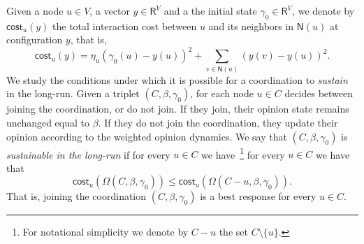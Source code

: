 \documentclass[letterpaper,11pt]{article}
\newcommand{\RR}{\mathsf{R}}
\newcommand{\nsf}{\mathsf{N}}
\newcommand{\cost}{\mathsf{cost}}
\begin{document}
Given a node $u\in V$, a vector $y\in \RR^V$ and a the initial state $\gamma_0\in \RR^V$, we denote by $\cost_u(y)$ the total interaction cost between $u$ and its neighbors in $\nsf(u)$ at configuration $y$, that is,
\begin{equation*}
\cost_u(y)=\eta_u(\gamma_0(u)-y(u))^2+\sum_{v\in \nsf(u)}(y(v)-y(u))^2.
\end{equation*}
We study the conditions under which it is possible for a coordination to {\it sustain} in the long-run.
%
Given a triplet $(C,\beta,\gamma_0)$, for each node $u\in C$ decides between joining the coordination, or do not join.
If they join, their opinion state remains unchanged equal to $\beta$.
If they do not join the coordination, they update their opinion according to the weighted opinion dynamics.
We say that $(C,\beta,\gamma_0)$ is {\it sustainable in the long-run} if for every $u\in C$ we have~\footnote{For notational simplicity we denote by $C-u$ the set $C\setminus \{u\}$.} 
for every $u\in C$ we have that
\begin{equation*}
\cost_u(\Omega(C,\beta,\gamma_0))\le \cost_u(\Omega(C-u,\beta,\gamma_0)).
\end{equation*} 
That is, joining the coordination $(C,\beta,\gamma_0)$ is a best response for every $u\in C$.\\
\end{document}
